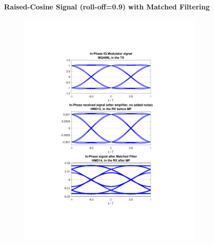\begin{refsection}
\begin{table}[H]
\begin{tabular}{|l|l|}
	\end{tabular}
\end{table}
\begin{figure}[H]
	\centering
	\textbf{Raised-Cosine Signal (roll-off=0.9) with Matched Filtering}
	\begin{minipage}{\linewidth}
		\centering
	\begin{subfigure}{.45\textwidth}
		\centering
		\includegraphics[clip, trim=4cm 4cm 4cm 4cm,
			width=\textwidth]{./sdf/m_qam_system/figures/eyes/simulRc09Sp60Np00_i.pdf}
	\end{subfigure}
	\begin{subfigure}{.45\textwidth}
		\centering

\end{subfigure}
\end{minipage}
\end{figure}
\end{refsection}
